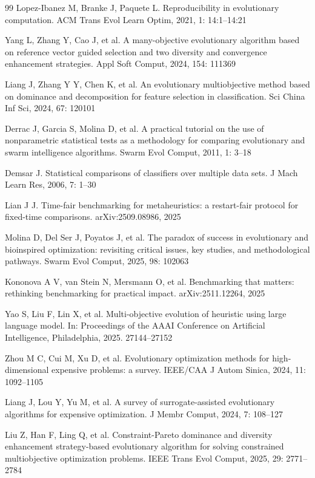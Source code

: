 \documentclass{SCIS2026}
\begin{document}
\begin{thebibliography}{99}
 Lopez-Ibanez M, Branke J, Paquete L. Reproducibility in evolutionary computation. ACM Trans Evol Learn Optim, 2021, 1: 14:1--14:21

 Yang L, Zhang Y, Cao J, et al. A many-objective evolutionary algorithm based on reference vector guided selection and two diversity and convergence enhancement strategies. Appl Soft Comput, 2024, 154: 111369

 Liang J, Zhang Y Y, Chen K, et al. An evolutionary multiobjective method based on dominance and decomposition for feature selection in classification. Sci China Inf Sci, 2024, 67: 120101

 Derrac J, Garcia S, Molina D, et al. A practical tutorial on the use of nonparametric statistical tests as a methodology for comparing evolutionary and swarm intelligence algorithms. Swarm Evol Comput, 2011, 1: 3--18

 Demsar J. Statistical comparisons of classifiers over multiple data sets. J Mach Learn Res, 2006, 7: 1--30

 Lian J J. Time-fair benchmarking for metaheuristics: a restart-fair protocol for fixed-time comparisons. arXiv:2509.08986, 2025

 Molina D, Del Ser J, Poyatos J, et al. The paradox of success in evolutionary and bioinspired optimization: revisiting critical issues, key studies, and methodological pathways. Swarm Evol Comput, 2025, 98: 102063

 Kononova A V, van Stein N, Mersmann O, et al. Benchmarking that matters: rethinking benchmarking for practical impact. arXiv:2511.12264, 2025

 Yao S, Liu F, Lin X, et al. Multi-objective evolution of heuristic using large language model. In: Proceedings of the AAAI Conference on Artificial Intelligence, Philadelphia, 2025. 27144--27152

 Zhou M C, Cui M, Xu D, et al. Evolutionary optimization methods for high-dimensional expensive problems: a survey. IEEE/CAA J Autom Sinica, 2024, 11: 1092--1105

 Liang J, Lou Y, Yu M, et al. A survey of surrogate-assisted evolutionary algorithms for expensive optimization. J Membr Comput, 2024, 7: 108--127

 Liu Z, Han F, Ling Q, et al. Constraint-Pareto dominance and diversity enhancement strategy-based evolutionary algorithm for solving constrained multiobjective optimization problems. IEEE Trans Evol Comput, 2025, 29: 2771--2784


\end{thebibliography}
\end{document}
